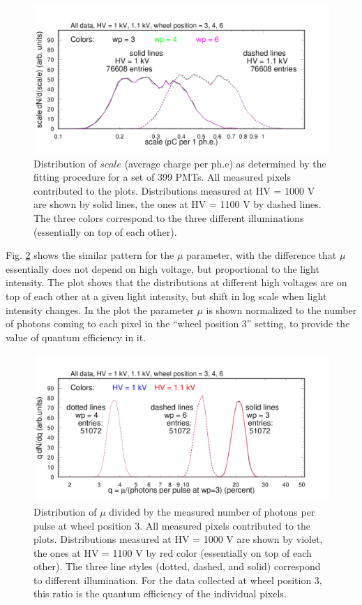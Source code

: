 \begin{figure}
	\centering
	\includegraphics[width=0.95\linewidth]{figures/pglobal_sc.pdf}
	\caption{Distribution of $scale$ (average charge per ph.e) as determined by the fitting procedure for a set of 399 PMTs. All measured pixels contributed to the plots. Distributions measured at HV = 1000 V are shown by solid lines, the ones at HV = 1100 V by dashed lines. The three colors correspond to the three different illuminations (essentially on top of each other).
	}
	\label{fig:pglobal_sc}
\end{figure}

Fig. \ref{fig:pglobal_qe_all} shows the similar pattern for the $\mu$ parameter, with the difference that $\mu$ essentially does not depend on high voltage, but proportional to the light intensity. The plot shows that the distributions at different high voltages are on top of each other at a given light intensity, but shift in log scale when light intensity changes. In the plot the parameter $\mu$ is shown normalized to the number of photons coming to each pixel in the ``wheel position 3'' setting, to provide the value of quantum efficiency in it. 
\begin{figure}
	\centering
	\includegraphics[width=0.95\linewidth]{figures/pglobal_qe_all.pdf}
	\caption{Distribution of $\mu$ divided by the measured number of photons per pulse at wheel position 3. All measured pixels contributed to the plots. Distributions measured at HV = 1000 V are shown by violet, the ones at HV = 1100 V by red color (essentially on top of each other). The three line styles (dotted, dashed, and solid) correspond to different illumination. For the data collected at wheel position 3, this ratio is the quantum efficiency of the individual pixels.}
	\label{fig:pglobal_qe_all}
\end{figure}


